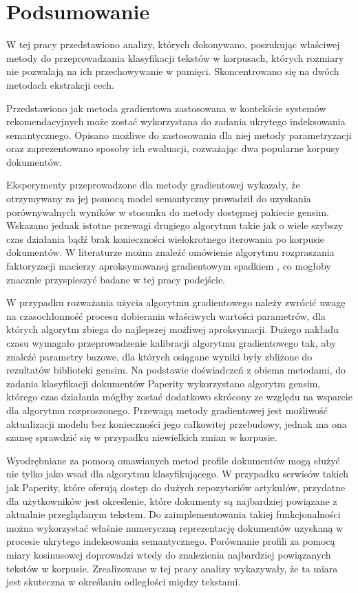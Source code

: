 \documentclass{pracamgr}
\begin{document}
\chapter{Podsumowanie}

W tej pracy przedstawiono analizy, których dokonywano, poszukując właściwej metody do przeprowadzania klasyfikacji tekstów w korpusach, których rozmiary nie pozwalają na ich przechowywanie w pamięci. Skoncentrowano się na dwóch metodach ekstrakcji cech.

Przedstawiono jak metoda gradientowa zastosowana w kontekście systemów rekomendacyjnych może zostać wykorzystana do zadania ukrytego indeksowania semantycznego. Opisano możliwe do zastosowania dla niej metody parametryzacji oraz zaprezentowano sposoby ich ewaluacji, rozważając dwa popularne korpusy dokumentów.

Eksperymenty przeprowadzone dla metody gradientowej wykazały, że otrzymywany za jej pomocą model semantyczny prowadził do uzyskania porównywalnych wyników w stosunku do metody dostępnej pakiecie gensim. Wskazano jednak istotne przewagi drugiego algorytmu takie jak o wiele szybszy czas działania bądź brak konieczności wielokrotnego iterowania po korpusie dokumentów. W literaturze można znaleźć omówienie algorytmu rozpraszania faktoryzacji macierzy aproksymowanej gradientowym spadkiem \cite{gemulla}, co mogłoby znacznie przyspieszyć badane w tej pracy podejście.

W przypadku rozważania użycia algorytmu gradientowego należy zwrócić uwagę na czasochłonność procesu dobierania właściwych wartości parametrów, dla których algorytm zbiega do najlepszej możliwej aproksymacji. Dużego nakładu czasu wymagało przeprowadzenie kalibracji algorytmu gradientowego tak, aby znaleźć parametry bazowe, dla których osiągane wyniki były zbliżone do rezultatów biblioteki gensim. Na podstawie doświadczeń z obiema metodami, do zadania klasyfikacji dokumentów Paperity wykorzystano algorytm gensim, którego czas działania mógłby zostać dodatkowo skrócony ze względu na wsparcie dla algorytmu rozproszonego. Przewagą metody gradientowej jest możliwość aktualizacji modelu bez konieczności jego całkowitej przebudowy, jednak ma ona szansę sprawdzić się w przypadku niewielkich zmian w korpusie. 

Wyodrębniane za pomocą omawianych metod profile dokumentów mogą służyć nie tylko jako wsad dla algorytmu klasyfikującego. W przypadku serwisów takich jak Paperity, które oferują dostęp do dużych repozytoriów artykułów, przydatne dla użytkowników jest określenie, które dokumenty są najbardziej powiązane z aktualnie przeglądanym tekstem. Do zaimplementowania takiej funkcjonalności można wykorzystać właśnie numeryczną reprezentację dokumentów uzyskaną w procesie ukrytego indeksowania semantycznego. Porównanie profili za pomocą miary kosinusowej doprowadzi wtedy do znalezienia najbardziej powiązanych tekstów w korpusie. Zrealizowane w tej pracy analizy wykazywały, że ta miara jest skuteczna w określaniu odległości między tekstami.
\end{document}
